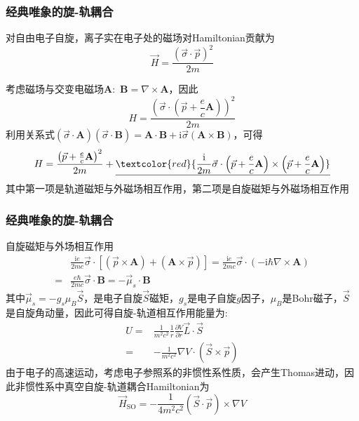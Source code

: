 \frame
{
	\frametitle{经典唯象的旋-轨耦合}
对自由电子自旋，离子实在电子处的磁场对\textrm{Hamiltonian}贡献为
\begin{displaymath}
	\vec H=\frac{(\vec{\sigma}\cdot\vec p)^2}{2m}
\end{displaymath}

考虑磁场与交变电磁场$\mathbf{A}$:~$\mathbf B=\nabla\times\mathbf A$，因此
\begin{displaymath}
	H=\frac{\left( \vec{\sigma}\cdot\left( \vec p+\dfrac ec\mathbf A \right) \right)^2}{2m}
\end{displaymath}
利用关系式$(\vec{\sigma}\cdot\mathbf A)(\vec{\sigma}\cdot\mathbf B)=\mathbf{A}\cdot\mathbf{B}+\mathrm{i}\vec{\sigma}(\mathbf{A}\times\mathbf{B})$，可得
\begin{displaymath}
	H=\frac{\left( \vec p+\frac ec\mathbf{A} \right)^2}{2m}+\underline{\textcolor{red}{\frac{\mathrm i}{2m}\vec{\sigma}\cdot\left( \vec p+\frac ec\mathbf{A} \right)\times\left( \vec p+\frac ec\mathbf{A} \right)}}
\end{displaymath}
其中第一项是轨道磁矩与外磁场相互作用，第二项是自旋磁矩与外磁场相互作用
}

\frame
{
	\frametitle{经典唯象的旋-轨耦合}
	自旋磁矩与外场相互作用
	\begin{displaymath}
		\begin{aligned}
			&\frac{\mathrm{i}e}{2mc}\vec\sigma\cdot[(\vec p\times\mathbf{A})+(\mathbf{A}\times\vec p)]=\frac{\mathrm{i}e}{2mc}\vec{\sigma}\cdot(-\mathrm{i}\hbar\nabla\times\mathbf{A})\\
			=&\frac{e\hbar}{2mc}\vec{\sigma}\cdot\mathbf{B}=-\vec{\mu}_s\cdot\mathbf{B}
		\end{aligned}
	\end{displaymath}
	其中$\vec \mu_s=-g_s\mu_B\vec S$，是电子自旋$\vec S$磁矩，$g_s$是电子自旋$g$因子，$\mu_B$是\textrm{Bohr}磁子，$\vec S$是自旋角动量，因此可得自旋-轨道相互作用能量为:
	\begin{displaymath}
		\begin{aligned}
			U=&\frac1{m^2c^2}\frac1r\frac{\partial V}{\partial r}\vec L\cdot\vec S\\
			=&-\frac1{m^2c^2}\nabla V\cdot(\vec S\times\vec p)
		\end{aligned}
	\end{displaymath}
	由于电子的高速运动，考虑电子参照系的非惯性系性质，会产生\textrm{Thomas}进动，因此非惯性系中真空自旋-轨道耦合\textrm{Hamiltonian}为
	\begin{displaymath}
		\vec H_{\mathrm{SO}}=-\frac1{4m^2c^2}(\vec S\cdot\vec p)\times\nabla V
	\end{displaymath}
}

